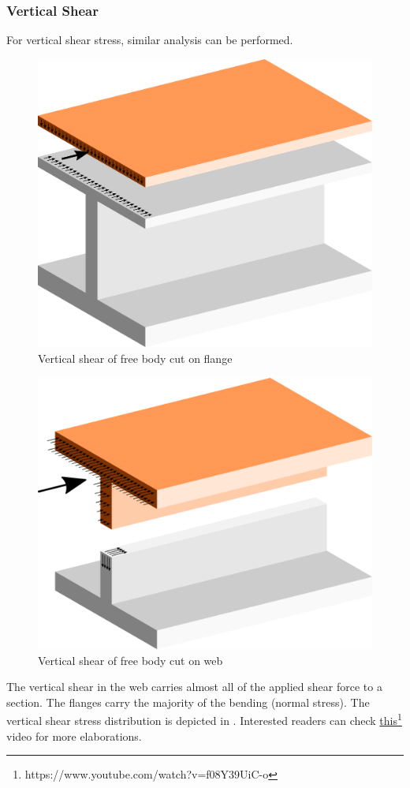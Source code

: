 \subsubsection{Vertical Shear}
For vertical shear stress, similar analysis can be performed.
\begin{figure}[H]
\centering
\includegraphics[width=.7\textwidth]{PIC/CH05/SFC}
\caption{Vertical shear of free body cut on flange}
\end{figure}
\begin{figure}[H]
\centering
\includegraphics[width=.7\textwidth]{PIC/CH05/SFD}
\caption{Vertical shear of free body cut on web}
\end{figure}
The vertical shear in the web carries almost all of the applied shear force to a section. The flanges carry the majority of the bending (normal stress). The vertical shear stress distribution is depicted in . Interested readers can check \href{https://www.youtube.com/watch?v=f08Y39UiC-o}{this}\footnote{https://www.youtube.com/watch?v=f08Y39UiC-o} video for more elaborations.
